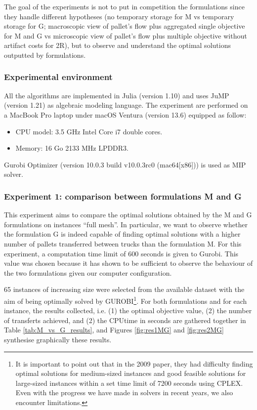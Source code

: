 \documentclass[preprint,12pt,authoryear]{elsarticle}
\begin{document}
The goal of the experiments is not to put in competition the formulations since they handle different hypotheses (no temporary storage for M vs temporary storage for G; macroscopic view of pallet's flow plus aggregated single objective for M and G vs microscopic view of pallet's flow plus multiple objective without artifact costs for 2R), but to observe and understand the optimal solutions outputted by formulations.

%
%
\subsubsection{Experimental environment}

All the algorithms are implemented in Julia (version 1.10) and uses JuMP (version 1.21) as algebraic modeling language.
The experiment are performed on a  MacBook Pro laptop under macOS Ventura (version 13.6) equipped as follow:
\begin{itemize}
    \item CPU model: 3.5 GHz Intel Core i7 double cores.
    \item Memory: 16 Go 2133 MHz LPDDR3.
\end{itemize}
Gurobi Optimizer (version 10.0.3 build v10.0.3rc0 (mac64[x86]))  is used as MIP solver.  


%
%
\subsubsection{Experiment 1: comparison between formulations M and G}\label{sec:resMG}

This experiment aims to compare the optimal solutions obtained by the M and G formulations on instances ``full mesh''.
%
In particular, we want to observe whether the formulation G is indeed capable of finding optimal solutions with a higher number of pallets transferred between trucks than the formulation M.
%
For this experiment, a computation time limit of 600 seconds is given to Gurobi.
This value was chosen because it has shown to be sufficient to observe the behaviour of the two formulations given our computer configuration.

65 instances of increasing size were selected from the available dataset with the aim of being optimally solved by GUROBI\footnote{It is important to point out that in the 2009 paper, they had difficulty finding optimal solutions for medium-sized instances and good feasible solutions for large-sized instances within a set time limit of 7200 seconds using CPLEX. Even with the progress we have made in solvers in recent years, we also encounter limitations.}.
%
For both formulations and for each instance, the results collected, i.e. (1) the optimal objective value, (2) the number of transferts achieved, and (2) the CPUtime in seconds 
are gathered together in Table \ref{tab:M_vs_G_results}, and Figures \ref{fig:res1MG} and \ref{fig:res2MG} synthesise  graphically these results.
\end{document}
